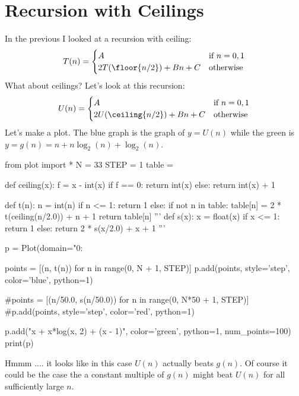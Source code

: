 \section{Recursion with Ceilings}

In the previous I looked at a recursion with  ceiling:
\[
T(n) =
\begin{cases}
A                        & \text{if $n = 0, 1$} \\
2T(\floor{n/2}) + Bn + C & \text{otherwise}
\end{cases} 
\]
What about ceilings?
Let's look at this recursion:
\[
U(n) = 
\begin{cases}
A                          & \text{if $n = 0, 1$} \\
2U(\ceiling{n/2}) + Bn + C & \text{otherwise}
\end{cases}
\]
Let's make a plot.
The blue graph is the graph of $y = U(n)$
while the green is $y = g(n) = n + n \log_2(n) + \log_2(n)$.

\begin{python}
from plot import *
N = 33
STEP = 1
table = {}

def ceiling(x):
    f = x - int(x)
    if f == 0: return int(x)
    else: return int(x) + 1

def t(n):
    n = int(n)
    if n <= 1: return 1
    else:
        if not n in table:
            table[n] = 2 * t(ceiling(n/2.0)) + n + 1
        return table[n]
'''
def s(x):
    x = float(x)
    if x <= 1: return 1
    else:
        return 2 * s(x/2.0) + x + 1
'''

p = Plot(domain="0:%

points = [(n, t(n)) for n in range(0, N + 1, STEP)]
p.add(points, style='step', color='blue', python=1)

#points = [(n/50.0, s(n/50.0)) for n in range(0, N*50 + 1, STEP)]
#p.add(points, style='step', color='red', python=1)


p.add("x + x*log(x, 2) + (x - 1)", color='green', python=1, num_points=100)
print(p)

\end{python}

Hmmm .... it looks like in this case $U(n)$ actually beats
$g(n)$.
Of course it could be the case the a constant multiple of $g(n)$
might beat $U(n)$ for all sufficiently large $n$.

